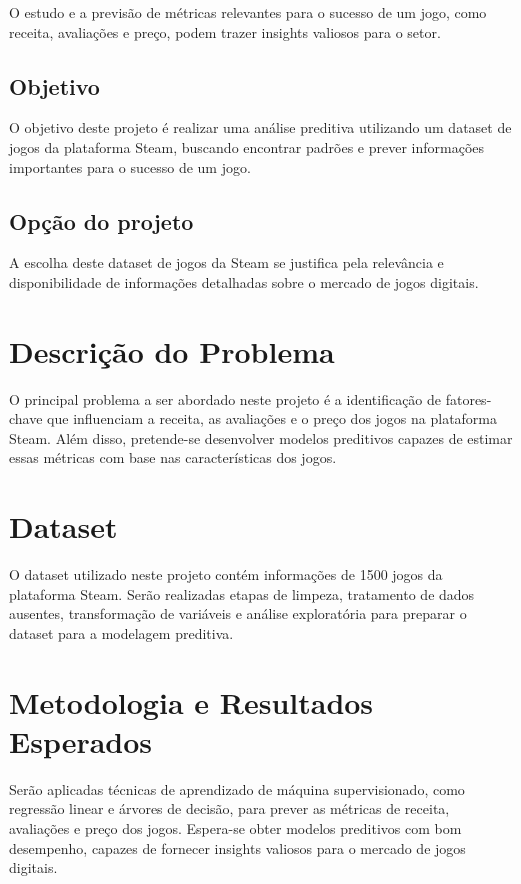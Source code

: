 \documentclass[12pt]{article}
\begin{document}
O estudo e a previsão de métricas relevantes para o sucesso de um jogo, como receita, 
avaliações e preço, podem trazer insights valiosos para o setor.

\subsection{Objetivo}

O objetivo deste projeto é realizar uma análise preditiva utilizando um dataset de 
jogos da plataforma Steam, buscando encontrar padrões e prever informações 
importantes para o sucesso de um jogo.

\subsection{Opção do projeto}

A escolha deste dataset de jogos da Steam se justifica pela relevância e 
disponibilidade de informações detalhadas sobre o mercado de jogos digitais.

\section{Descrição do Problema}

O principal problema a ser abordado neste projeto é a identificação de fatores-chave 
que influenciam a receita, as avaliações e o preço dos jogos na plataforma Steam. 
Além disso, pretende-se desenvolver modelos preditivos capazes de estimar essas 
métricas com base nas características dos jogos.

\section{Dataset}

O dataset utilizado neste projeto contém informações de 1500 jogos da plataforma 
Steam. Serão realizadas etapas de limpeza, tratamento de dados ausentes, 
transformação de variáveis e análise exploratória para preparar o dataset para a 
modelagem preditiva.

\section{Metodologia e Resultados Esperados}

Serão aplicadas técnicas de aprendizado de máquina supervisionado, como regressão 
linear e árvores de decisão, para prever as métricas de receita, avaliações e 
preço dos jogos. Espera-se obter modelos preditivos com bom desempenho, capazes 
de fornecer insights valiosos para o mercado de jogos digitais.
\end{document}
